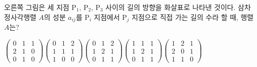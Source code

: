 \hspace*{2mm}\begin{minipage}[t]{\dimexpr\linewidth-2mm\relax}\vspace{0pt}
\noindent\begin{minipage}[t]{0.58\linewidth}\vspace{0pt}\raggedright 오른쪽 그림은 세 지점 $\mathrm{P}_1$, $\mathrm{P}_2$, $\mathrm{P}_3$ 사이의 길의 방향을 화살표로 나타낸 것이다. 삼차 정사각행렬 $A$의 성분 $a_{ij}$를 $\mathrm{P}_i$ 지점에서 $\mathrm{P}_j$ 지점으로 직접 가는 길의 수라 할 때, 행렬 $A$는?\end{minipage}\hfill\begin{minipage}[t]{0.4\linewidth}\vspace{0pt}\centering \resizebox{\ifdim\width>\linewidth\linewidth\else\width\fi}{!}{}\end{minipage}\par
\begin{choicesii}{$\begin{pmatrix} 0 & 1 & 1 \\ 2 & 1 & 0 \\ 0 & 1 & 0 \end{pmatrix}$}{$\begin{pmatrix} 0 & 1 & 2 \\ 1 & 1 & 1 \\ 1 & 0 & 0 \end{pmatrix}$}{$\begin{pmatrix} 0 & 1 & 2 \\ 1 & 2 & 1 \\ 0 & 1 & 1 \end{pmatrix}$}{$\begin{pmatrix} 1 & 1 & 1 \\ 1 & 2 & 1 \\ 0 & 1 & 1 \end{pmatrix}$}{$\begin{pmatrix} 1 & 2 & 1 \\ 2 & 0 & 1 \\ 1 & 1 & 0 \end{pmatrix}$}\end{choicesii}\end{minipage}
